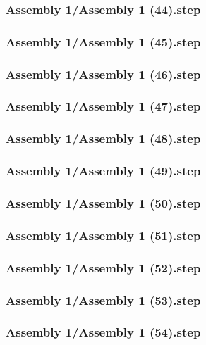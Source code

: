 \documentclass[a4paper,12pt]{article}
\begin{document}
\begin{lstlising}[language=C++]
\subsubsection{Assembly 1/Assembly 1 (44).step}

\subsubsection{Assembly 1/Assembly 1 (45).step}

\subsubsection{Assembly 1/Assembly 1 (46).step}

\subsubsection{Assembly 1/Assembly 1 (47).step}

\subsubsection{Assembly 1/Assembly 1 (48).step}

\subsubsection{Assembly 1/Assembly 1 (49).step}

\subsubsection{Assembly 1/Assembly 1 (50).step}

\subsubsection{Assembly 1/Assembly 1 (51).step}

\subsubsection{Assembly 1/Assembly 1 (52).step}

\subsubsection{Assembly 1/Assembly 1 (53).step}

\subsubsection{Assembly 1/Assembly 1 (54).step}


\end{lstlising}
\end{document}
